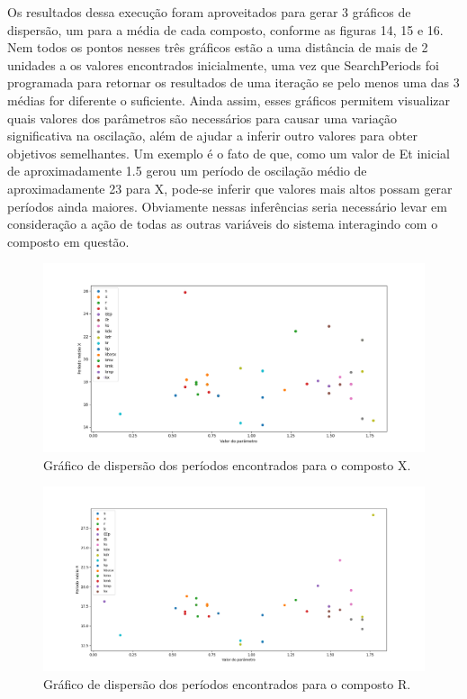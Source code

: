 \documentclass[brazilian,12pt,a4paper,final]{article}
\begin{document}
	Os resultados dessa execução foram aproveitados para gerar 3 gráficos de dispersão, um para a média de cada composto, conforme as figuras 14, 15 e 16. Nem todos os pontos nesses três gráficos estão a uma distância de mais de 2 unidades a os valores encontrados inicialmente, uma vez que SearchPeriods foi programada para retornar os resultados de uma iteração se pelo menos uma das 3 médias for diferente o suficiente. Ainda assim, esses gráficos permitem visualizar quais valores dos parâmetros são necessários para causar uma variação significativa na oscilação, além de ajudar a inferir outro valores para obter objetivos semelhantes. Um exemplo é o fato de que, como um valor de Et inicial de aproximadamente 1.5 gerou um período de oscilação médio de aproximadamente 23 para X, pode-se inferir que valores mais altos possam gerar períodos ainda maiores. Obviamente nessas inferências seria necessário levar em consideração a ação de todas as outras variáveis do sistema interagindo com o composto em questão.
	
		\begin{figure}[hbtp]
		\begin{center}
			\includegraphics[width=16cm]{ParamsX.png}
			\caption{Gráfico de dispersão dos períodos encontrados para o composto X.}
			\label{fig}
		\end{center}
	\end{figure}
	
	\begin{figure}[hbtp]
		\begin{center}
			\includegraphics[width=16cm]{ParamsR.png}
			\caption{Gráfico de dispersão dos períodos encontrados para o composto R.}
			\label{fig}
		\end{center}
	\end{figure}
	
\end{document}
